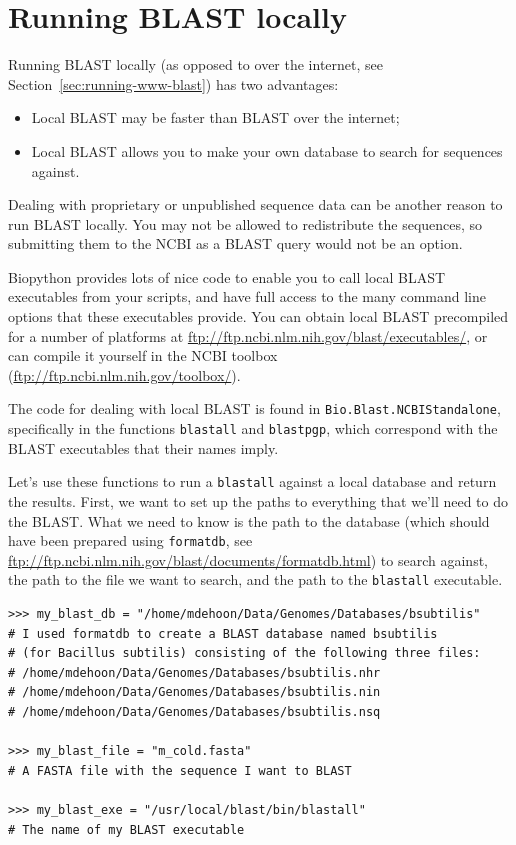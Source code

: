 \documentclass{report}
\begin{document}
\section{Running BLAST locally}
\label{sec:running-local-blast}

Running BLAST locally (as opposed to over the internet, see
Section~\ref{sec:running-www-blast}) has two advantages:
\begin{itemize}
\item Local BLAST may be faster than BLAST over the internet;
\item Local BLAST allows you to make your own database to search for sequences against.
\end{itemize}
Dealing with proprietary or unpublished sequence data can be another reason to run BLAST locally.  You may not be allowed to redistribute the sequences, so submitting them to the NCBI as a BLAST query would not be an option. 

Biopython provides lots of nice code to enable you to call local BLAST executables from your scripts, and have full access to the many command line options that these executables provide. You can obtain local BLAST precompiled for a number of platforms at \url{ftp://ftp.ncbi.nlm.nih.gov/blast/executables/}, or can compile it yourself in the NCBI toolbox (\url{ftp://ftp.ncbi.nlm.nih.gov/toolbox/}).

The code for dealing with local BLAST is found in \verb|Bio.Blast.NCBIStandalone|, specifically in the functions \verb|blastall| and \verb|blastpgp|, which correspond with the BLAST executables that their names imply.

Let's use these functions to run a \verb|blastall| against a local database and return the results. First, we want to set up the paths to everything that we'll need to do the BLAST. What we need to know is the path to the database (which should have been prepared using \verb|formatdb|, see \url{ftp://ftp.ncbi.nlm.nih.gov/blast/documents/formatdb.html}) to search against, the path to the file we want to search, and the path to the \verb|blastall| executable.


\begin{verbatim}
>>> my_blast_db = "/home/mdehoon/Data/Genomes/Databases/bsubtilis"
# I used formatdb to create a BLAST database named bsubtilis
# (for Bacillus subtilis) consisting of the following three files:
# /home/mdehoon/Data/Genomes/Databases/bsubtilis.nhr
# /home/mdehoon/Data/Genomes/Databases/bsubtilis.nin
# /home/mdehoon/Data/Genomes/Databases/bsubtilis.nsq

>>> my_blast_file = "m_cold.fasta"
# A FASTA file with the sequence I want to BLAST

>>> my_blast_exe = "/usr/local/blast/bin/blastall"
# The name of my BLAST executable
\end{verbatim}
\end{document}
